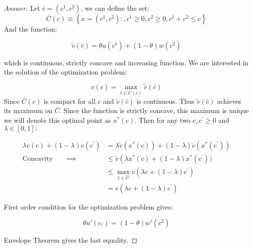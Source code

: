 \documentclass[12pt]{article}
\theoremstyle{definition}
\newcommand{\qiq}{\qquad \implies \qquad}
\begin{document}
\begin{proof}[Answer]
Let $\bar{c}=\left(c^{1}, c^{2}\right)$, we can define the set:
$$
\bar{C}(c) \equiv\left\{x=\left(c^{1}, c^{2}\right):, c^{1} \geq 0, c^{2} \geq 0, c^{1}+c^{2} \leq c\right\}
$$
And the function:

$$\tilde{v}(\bar{c})=\theta u\left(c^{1}\right)+(1-\theta) w\left(c^{2}\right)$$

which is continuous, strictly concave and increasing function. We are interested in the solution of the optimization problem:

$$
v(c)=\max _{\bar{c} \in \bar{C}(c)} \tilde{v}(\bar{c})
$$
Since $\bar{C}(c)$ is compact for all $c$ and $\tilde{v}(\bar{c})$ is continuous. Thus $\tilde{v}(\bar{c})$ achieves its maximum on $\bar{C}$. Since the function is strictly concave, this maximum is unique we will denote this optimal point as $x^{*}(c)$. 
Then for any two $c, c^{\prime} \geq 0$ and $\lambda \in[0,1]:$

\begin{align*}
\lambda v(c)+(1-\lambda) v\left(c^{\prime}\right)&=\lambda \tilde{v}\left(x^{*}(c)\right)+(1-\lambda) \tilde{v}\left(x^{*}\left(c^{\prime}\right)\right)\\ \text{Concavity}\qiq   &\leq \tilde{v}\left(\lambda x^{*}(c)+(1-\lambda) x^{*}\left(c^{\prime}\right)\Big)\\
&\leq \max_{\hat{c} \in \hat{C}} v\left(\lambda c+(1-\lambda) c^{\prime}\right) \\
&= v\left(\lambda c+(1-\lambda) c^{\prime}\right)
\end{align*}

First order condition for the optimization problem gives:

$$\theta u'(c_^1) = (1-\theta)w'(c^2)$$

Envelope Theorem gives the last equality.

\end{proof}
\end{document}
